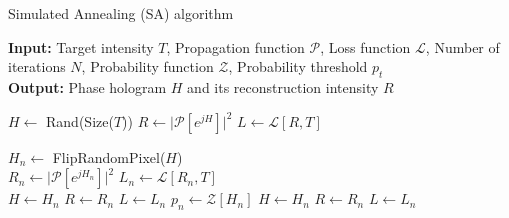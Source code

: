 \begin{algorithm}[H]
  \caption{Simulated Annealing (SA) algorithm}\label{alg:Simulated Annealing (SA) algorithm}
  \textbf{Input:} Target intensity $T$, Propagation function $\mathcal{P}$, Loss function $\mathcal{L}$, Number of iterations $N$, Probability function $\mathcal{Z}$, Probability threshold $p_t$ \\
  \textbf{Output:} Phase hologram $H$ and its reconstruction intensity $R$
  \begin{algorithmic}
    \State $H \gets$ Rand(Size($T$))
    \State $R \gets \vert \mathcal{P}[e^{jH}] \vert ^2$
    \State $L \gets \mathcal{L} [R, T]$

    \State $H_n \gets$ FlipRandomPixel($H$)\\
    \State $R_n \gets \vert \mathcal{P}[e^{jH_n}] \vert ^2$
    \State $L_n \gets \mathcal{L} [R_n, T]$\\
    \State $H \gets H_n$
    \State $R \gets R_n$
    \State $L \gets L_n$
    \Else
    \State $p_n \gets \mathcal{Z}[H_n]$
    \State $H \gets H_n$
    \State $R \gets R_n$
    \State $L \gets L_n$
    \EndIf
    \EndIf
    \EndFor
  \end{algorithmic}
\end{algorithm}


